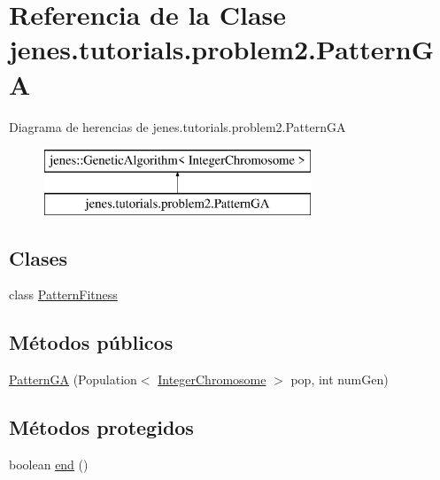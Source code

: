 \hypertarget{classjenes_1_1tutorials_1_1problem2_1_1_pattern_g_a}{\section{Referencia de la Clase jenes.\-tutorials.\-problem2.\-Pattern\-G\-A}
\label{classjenes_1_1tutorials_1_1problem2_1_1_pattern_g_a}
}
Diagrama de herencias de jenes.\-tutorials.\-problem2.\-Pattern\-G\-A\begin{figure}[H]
\begin{center}
\leavevmode
\includegraphics[height=2.000000cm]{classjenes_1_1tutorials_1_1problem2_1_1_pattern_g_a}
\end{center}
\end{figure}
\subsection*{Clases}
\begin{DoxyCompactItemize}
\item 
class \hyperlink{classjenes_1_1tutorials_1_1problem2_1_1_pattern_g_a_1_1_pattern_fitness}{Pattern\-Fitness}
\end{DoxyCompactItemize}
\subsection*{Métodos públicos}
\begin{DoxyCompactItemize}
\item 
\hyperlink{classjenes_1_1tutorials_1_1problem2_1_1_pattern_g_a_a009d1901fabdcabacb443297eb2295ce}{Pattern\-G\-A} (Population$<$ \hyperlink{classjenes_1_1chromosome_1_1_integer_chromosome}{Integer\-Chromosome} $>$ pop, int num\-Gen)
\end{DoxyCompactItemize}
\subsection*{Métodos protegidos}
\begin{DoxyCompactItemize}
\item 
boolean \hyperlink{classjenes_1_1tutorials_1_1problem2_1_1_pattern_g_a_a3785b5c77bc9bfab62fd3ef7c6ea8fb9}{end} ()
\end{DoxyCompactItemize}


